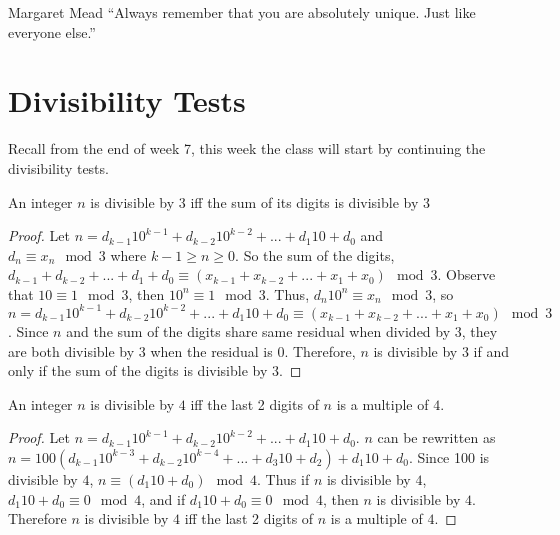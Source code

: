 \newtheorem{lemma}[theorem]{Lemma}

\newenvironment{remark}[1][Remark]{\begin{trivlist}
\item[\hskip \labelsep {\bfseries #1}]}{\end{trivlist}}

\renewcommand{\qed}{\nobreak \ifvmode \relax \else
      \ifdim\lastskip<1.5em \hskip-\lastskip
      \hskip1.5em plus0em minus0.5em \fi \nobreak
      \vrule height0.75em width0.5em depth0.25em\fi}

\begin{chapquote}{Margaret Mead}
``Always remember that you are absolutely unique. Just like everyone else.''
\end{chapquote}

\section{Divisibility Tests}

Recall from the end of week 7, this week the class will start by continuing the divisibility tests. 
\begin{theorem}
An integer $n$ is divisible by $3$ iff the sum of its digits is divisible by $3$
\end{theorem}

\begin{proof}
Let $n = d_{k-1}10^{k-1} + d_{k-2}10^{k-2} + ... + d_{1}10 + d_{0}$ and\\ $d_n \equiv x_n \mod3$ where $k-1 \geq n \geq 0$. So the sum of the digits, $d_{k-1} + d_{k-2}+ ... + d_{1}+ d_{0} \equiv (x_{k-1} + x_{k-2} + ... + x_1 + x_0) \mod 3$. Observe that $10 \equiv 1 \mod 3$, then $10^n \equiv 1 \mod 3$. Thus, $d_n10^n \equiv x_n \mod3$, so $n = d_{k-1}10^{k-1} + d_{k-2}10^{k-2} + ... + d_{1}10 + d_{0} \equiv (x_{k-1} + x_{k-2} + ... + x_1 + x_0) \mod 3$. Since $n$ and the sum of the digits share same residual when divided by $3$, they are both divisible by $3$ when the residual is $0$. Therefore, $n$ is divisible by $3$ if and only if the sum of the digits is divisible by $3$.
\end{proof}

\begin{theorem}
An integer $n$ is divisible by $4$ iff the last 2 digits of $n$ is a multiple of $4$.
\end{theorem}

\begin{proof}
Let $n = d_{k-1}10^{k-1} + d_{k-2}10^{k-2} + ... + d_{1}10 + d_{0}$. $n$ can be rewritten as $n = 100(d_{k-1}10^{k-3} + d_{k-2}10^{k-4} + ... + d_{3}10 + d_{2}) + d_{1}10 + d_{0}$. Since 100 is divisible by $4$, $n \equiv (d_{1}10 + d_{0}) \mod 4$. Thus if $n$ is divisible by $4$, $d_{1}10 + d_{0} \equiv 0 \mod 4$, and if $d_{1}10 + d_{0} \equiv 0 \mod 4$, then $n$ is divisible by $4$. Therefore $n$ is divisible by $4$ iff the last 2 digits of $n$ is a multiple of $4$.
\end{proof}

